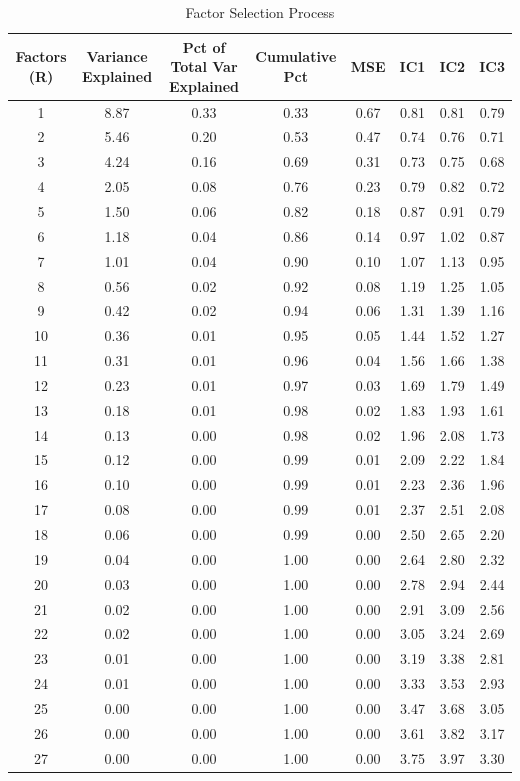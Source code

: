\documentclass[11pt, letterpaper]{article}\usepackage[]{graphicx}\usepackage[]{color}
\begin{document}
\begin{table}[H]
\centering
\begingroup\scriptsize
\begin{tabular}{cccccccc}
  \hline
Factors (R) & Variance Explained & Pct of Total Var Explained & Cumulative Pct & MSE & IC1 & IC2 & IC3 \\ 
  \hline
  1 & 8.87 & 0.33 & 0.33 & 0.67 & 0.81 & 0.81 & 0.79 \\ 
    2 & 5.46 & 0.20 & 0.53 & 0.47 & 0.74 & 0.76 & 0.71 \\ 
    3 & 4.24 & 0.16 & 0.69 & 0.31 & 0.73 & 0.75 & 0.68 \\ 
    4 & 2.05 & 0.08 & 0.76 & 0.23 & 0.79 & 0.82 & 0.72 \\ 
    5 & 1.50 & 0.06 & 0.82 & 0.18 & 0.87 & 0.91 & 0.79 \\ 
    6 & 1.18 & 0.04 & 0.86 & 0.14 & 0.97 & 1.02 & 0.87 \\ 
    7 & 1.01 & 0.04 & 0.90 & 0.10 & 1.07 & 1.13 & 0.95 \\ 
    8 & 0.56 & 0.02 & 0.92 & 0.08 & 1.19 & 1.25 & 1.05 \\ 
    9 & 0.42 & 0.02 & 0.94 & 0.06 & 1.31 & 1.39 & 1.16 \\ 
   10 & 0.36 & 0.01 & 0.95 & 0.05 & 1.44 & 1.52 & 1.27 \\ 
   11 & 0.31 & 0.01 & 0.96 & 0.04 & 1.56 & 1.66 & 1.38 \\ 
   12 & 0.23 & 0.01 & 0.97 & 0.03 & 1.69 & 1.79 & 1.49 \\ 
   13 & 0.18 & 0.01 & 0.98 & 0.02 & 1.83 & 1.93 & 1.61 \\ 
   14 & 0.13 & 0.00 & 0.98 & 0.02 & 1.96 & 2.08 & 1.73 \\ 
   15 & 0.12 & 0.00 & 0.99 & 0.01 & 2.09 & 2.22 & 1.84 \\ 
   16 & 0.10 & 0.00 & 0.99 & 0.01 & 2.23 & 2.36 & 1.96 \\ 
   17 & 0.08 & 0.00 & 0.99 & 0.01 & 2.37 & 2.51 & 2.08 \\ 
   18 & 0.06 & 0.00 & 0.99 & 0.00 & 2.50 & 2.65 & 2.20 \\ 
   19 & 0.04 & 0.00 & 1.00 & 0.00 & 2.64 & 2.80 & 2.32 \\ 
   20 & 0.03 & 0.00 & 1.00 & 0.00 & 2.78 & 2.94 & 2.44 \\ 
   21 & 0.02 & 0.00 & 1.00 & 0.00 & 2.91 & 3.09 & 2.56 \\ 
   22 & 0.02 & 0.00 & 1.00 & 0.00 & 3.05 & 3.24 & 2.69 \\ 
   23 & 0.01 & 0.00 & 1.00 & 0.00 & 3.19 & 3.38 & 2.81 \\ 
   24 & 0.01 & 0.00 & 1.00 & 0.00 & 3.33 & 3.53 & 2.93 \\ 
   25 & 0.00 & 0.00 & 1.00 & 0.00 & 3.47 & 3.68 & 3.05 \\ 
   26 & 0.00 & 0.00 & 1.00 & 0.00 & 3.61 & 3.82 & 3.17 \\ 
   27 & 0.00 & 0.00 & 1.00 & 0.00 & 3.75 & 3.97 & 3.30 \\ 
   \hline
\end{tabular}
\endgroup
\caption{Factor Selection Process} 
\end{table}
\end{document}
